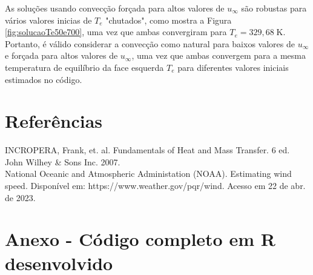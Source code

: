 \documentclass[12pt]{scrartcl}
\newcommand{\un}[1]{\;\textrm{#1}}
\begin{document}
As soluções usando convecção forçada para altos valores de $u_{\infty}$ são robustas para vários valores 
inicias de $T_e$ "chutados", como mostra a Figura \ref*{fig:solucaoTe50e700}, uma vez que ambas convergiram para $T_e = 329,68 \un{K}$. 
Portanto, é válido considerar a convecção como natural para baixos
valores de $u_{\infty}$ e forçada para altos valores de $u_{\infty}$, uma vez que ambas convergem para a mesma 
temperatura de equilíbrio da face esquerda $T_e$ para diferentes valores iniciais estimados no código.

\section{Referências}

INCROPERA, Frank, et. al. Fundamentals of Heat and Mass Transfer. 6 ed. John Wilhey \& Sons Inc. 2007. \\

National Oceanic and Atmospheric Administation (NOAA). Estimating wind speed. Disponível em: https://www.weather.gov/pqr/wind.
Acesso em 22 de abr. de 2023.

\section{Anexo - Código completo em R desenvolvido}
\end{document}
